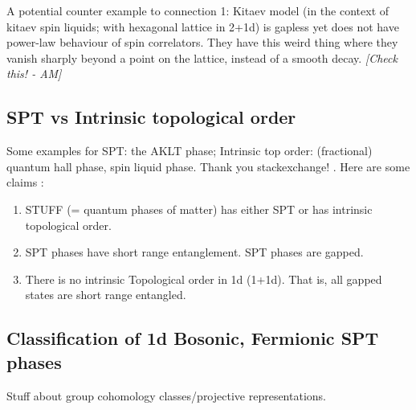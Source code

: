 \documentclass{article}
\newcommand\AM[1]{{\it \color{darkblue}  [#1 - AM]}}
\begin{document}
A potential counter example to connection 1: Kitaev model (in the context of kitaev spin liquids; with hexagonal lattice in 2+1d) is gapless yet does not have power-law behaviour of spin correlators. They have this weird thing where they vanish sharply beyond a point on the lattice, instead of a smooth decay.\AM{Check this!}
\subsection{SPT vs Intrinsic topological order}
Some examples for SPT: the AKLT phase; Intrinsic top order: (fractional) quantum hall phase, spin liquid phase. Thank you stackexchange! \cite{251464, 71160, 65897}. Here are some claims \cite{enwiki:1314883973}:
\begin{enumerate}
    \item STUFF (= quantum phases of matter) has either SPT or has intrinsic topological order.
    \item SPT phases have short range entanglement. SPT phases are gapped.
    \item There is no intrinsic Topological order in 1d (1+1d). That is, all gapped states are short range entangled.
\end{enumerate}
\subsection{Classification of 1d Bosonic, Fermionic SPT phases}
Stuff about group cohomology classes/projective representations.
\end{document}
